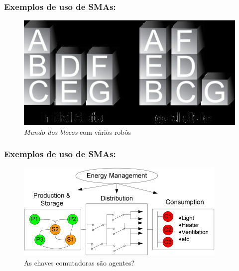 
\begin{frame} %

  \frametitle{Exemplos de uso de SMAs:}
        
\begin{figure}[!ht]
\centering
\includegraphics[height =.5\textheight,width=.7\textwidth]{figuras/example_SMAs01.jpg}
\caption{\textit{Mundo dos blocos} com vários robôs}
\end{figure}
    
\end{frame}

\begin{frame} %

  \frametitle{Exemplos de uso de SMAs:}
        
\begin{figure}[!ht]
\centering
\includegraphics[height =.6\textheight,width=.7\textwidth]{figuras/example_SMAs02.jpg}
\caption{As chaves comutadoras são agentes?}
\end{figure}
    
\end{frame}

